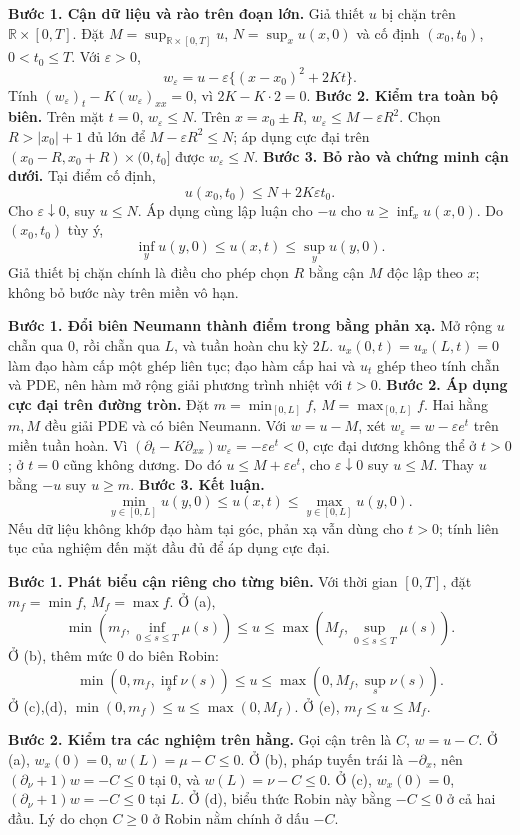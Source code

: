 \textbf{Bước 1. Cận dữ liệu và rào trên đoạn lớn.} Giả thiết $u$ bị chặn trên $\mathbb R\times[0,T]$. Đặt $M=\sup_{\mathbb R\times[0,T]}u$, $N=\sup_xu(x,0)$ và cố định $(x_0,t_0)$, $0<t_0\le T$. Với $\varepsilon>0$,
\[w_\varepsilon=u-\varepsilon\{(x-x_0)^2+2Kt\}.\]
Tính $(w_\varepsilon)_t-K(w_\varepsilon)_{xx}=0$, vì $2K-K\cdot2=0$.
\textbf{Bước 2. Kiểm tra toàn bộ biên.} Trên mặt $t=0$, $w_\varepsilon\le N$. Trên $x=x_0\pm R$, $w_\varepsilon\le M-\varepsilon R^2$. Chọn $R>|x_0|+1$ đủ lớn để $M-\varepsilon R^2\le N$; áp dụng cực đại trên $(x_0-R,x_0+R)\times(0,t_0]$ được $w_\varepsilon\le N$.
\textbf{Bước 3. Bỏ rào và chứng minh cận dưới.} Tại điểm cố định,
\[u(x_0,t_0)\le N+2K\varepsilon t_0.\]
Cho $\varepsilon\downarrow0$, suy $u\le N$. Áp dụng cùng lập luận cho $-u$ cho $u\ge\inf_xu(x,0)$. Do $(x_0,t_0)$ tùy ý,
\[\inf_yu(y,0)\le u(x,t)\le\sup_yu(y,0).\]
Giả thiết bị chặn chính là điều cho phép chọn $R$ bằng cận $M$ độc lập theo $x$; không bỏ bước này trên miền vô hạn.

\textbf{Bước 1. Đổi biên Neumann thành điểm trong bằng phản xạ.} Mở rộng $u$ chẵn qua $0$, rồi chẵn qua $L$, và tuần hoàn chu kỳ $2L$. $u_x(0,t)=u_x(L,t)=0$ làm đạo hàm cấp một ghép liên tục; đạo hàm cấp hai và $u_t$ ghép theo tính chẵn và PDE, nên hàm mở rộng giải phương trình nhiệt với $t>0$.
\textbf{Bước 2. Áp dụng cực đại trên đường tròn.} Đặt $m=\min_{[0,L]}f$, $M=\max_{[0,L]}f$. Hai hằng $m,M$ đều giải PDE và có biên Neumann. Với $w=u-M$, xét $w_\varepsilon=w-\varepsilon e^t$ trên miền tuần hoàn. Vì $(\partial_t-K\partial_{xx})w_\varepsilon=-\varepsilon e^t<0$, cực đại dương không thể ở $t>0$; ở $t=0$ cũng không dương. Do đó $u\le M+\varepsilon e^t$, cho $\varepsilon\downarrow0$ suy $u\le M$. Thay $u$ bằng $-u$ suy $u\ge m$.
\textbf{Bước 3. Kết luận.}
\[\min_{y\in[0,L]}u(y,0)\le u(x,t)\le\max_{y\in[0,L]}u(y,0).\]
Nếu dữ liệu không khớp đạo hàm tại góc, phản xạ vẫn dùng cho $t>0$; tính liên tục của nghiệm đến mặt đầu đủ để áp dụng cực đại.

\textbf{Bước 1. Phát biểu cận riêng cho từng biên.} Với thời gian $[0,T]$, đặt $m_f=\min f$, $M_f=\max f$. Ở (a),
\[\min(m_f,\inf_{0\le s\le T}\mu(s))\le u\le
\max(M_f,\sup_{0\le s\le T}\mu(s)).\]
Ở (b), thêm mức $0$ do biên Robin:
\[\min(0,m_f,\inf_s\nu(s))\le u\le\max(0,M_f,\sup_s\nu(s)).\]
Ở (c),(d), $\min(0,m_f)\le u\le\max(0,M_f)$. Ở (e), $m_f\le u\le M_f$.

\textbf{Bước 2. Kiểm tra các nghiệm trên hằng.} Gọi cận trên là $C$, $w=u-C$. Ở (a), $w_x(0)=0$, $w(L)=\mu-C\le0$. Ở (b), pháp tuyến trái là $-\partial_x$, nên $(\partial_\nu+1)w=-C\le0$ tại $0$, và $w(L)=\nu-C\le0$. Ở (c), $w_x(0)=0$, $(\partial_\nu+1)w=-C\le0$ tại $L$. Ở (d), biểu thức Robin này bằng $-C\le0$ ở cả hai đầu. Lý do chọn $C\ge0$ ở Robin nằm chính ở dấu $-C$.


